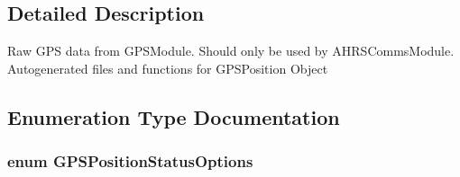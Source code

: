 \subsection{\-Detailed \-Description}
\-Raw \-G\-P\-S data from \-G\-P\-S\-Module. \-Should only be used by \-A\-H\-R\-S\-Comms\-Module. \-Autogenerated files and functions for \-G\-P\-S\-Position \-Object 

\subsection{\-Enumeration \-Type \-Documentation}
\hypertarget{group___g_p_s_position_ga5992105052f155e8055339cbb93eb332}{
\subsubsection[{\-G\-P\-S\-Position\-Status\-Options}]{\setlength{\rightskip}{0pt plus 5cm}enum {\bf \-G\-P\-S\-Position\-Status\-Options}}}\label{group___g_p_s_position_ga5992105052f155e8055339cbb93eb332}
